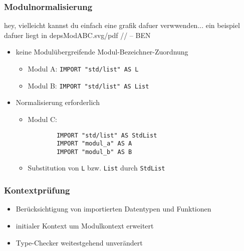 \begin{frame}[containsverbatim=true]
\frametitle{Modulnormalisierung}

hey, vielleicht kannst du einfach eine grafik dafuer verwwenden...
ein beispiel dafuer liegt in depsModABC.svg/pdf //
-- BEN

\begin{itemize}
\item keine Modulübergreifende Modul-Bezeichner-Zuordnung
	\begin{itemize}
	\item Modul A: \verb+IMPORT "std/list" AS L+
	\item Modul B: \verb+IMPORT "std/list" AS List+
	\end{itemize}
\item Normalisierung erforderlich
	\begin{itemize}
	\item Modul C:
		\begin{verbatim}
		IMPORT "std/list" AS StdList
		IMPORT "modul_a" AS A
		IMPORT "modul_b" AS B
		\end{verbatim}
	\item Substitution von \verb+L+ bzw. \verb+List+ durch \verb+StdList+
	\end{itemize}
\end{itemize}

\end{frame}


\begin{frame}
\frametitle{Kontextprüfung}

\begin{itemize}
\item Berücksichtigung von importierten Datentypen und Funktionen
\item initialer Kontext um Modulkontext erweitert
\item Type-Checker weitestgehend unverändert
\end{itemize}

\end{frame}
